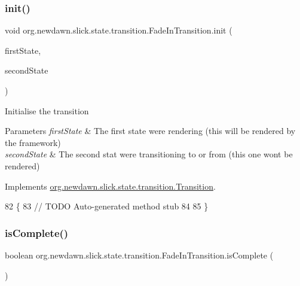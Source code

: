 \subsubsection{\texorpdfstring{init()}{init()}}
{\footnotesize\ttfamily void org.\+newdawn.\+slick.\+state.\+transition.\+Fade\+In\+Transition.\+init (\begin{DoxyParamCaption}\item[{\mbox{\hyperlink{interfaceorg_1_1newdawn_1_1slick_1_1state_1_1_game_state}{Game\+State}}}]{first\+State,  }\item[{\mbox{\hyperlink{interfaceorg_1_1newdawn_1_1slick_1_1state_1_1_game_state}{Game\+State}}}]{second\+State }\end{DoxyParamCaption})\hspace{0.3cm}{\ttfamily [inline]}}

Initialise the transition


\begin{DoxyParams}{Parameters}
{\em first\+State} & The first state we\textquotesingle{}re rendering (this will be rendered by the framework) \\
\hline
{\em second\+State} & The second stat we\textquotesingle{}re transitioning to or from (this one won\textquotesingle{}t be rendered) \\
\hline
\end{DoxyParams}


Implements \mbox{\hyperlink{interfaceorg_1_1newdawn_1_1slick_1_1state_1_1transition_1_1_transition_a7b59f0c9205f1f0417ee18bc526e5b01}{org.\+newdawn.\+slick.\+state.\+transition.\+Transition}}.


\begin{DoxyCode}
82                                                                   \{
83         \textcolor{comment}{// TODO Auto-generated method stub}
84         
85     \}
\end{DoxyCode}
\mbox{\label{classorg_1_1newdawn_1_1slick_1_1state_1_1transition_1_1_fade_in_transition_a449fa6073e39419c2689267e3ca18ca4}} 
\subsubsection{\texorpdfstring{is\+Complete()}{isComplete()}}
{\footnotesize\ttfamily boolean org.\+newdawn.\+slick.\+state.\+transition.\+Fade\+In\+Transition.\+is\+Complete (\begin{DoxyParamCaption}{ }\end{DoxyParamCaption})\hspace{0.3cm}{\ttfamily [inline]}}

